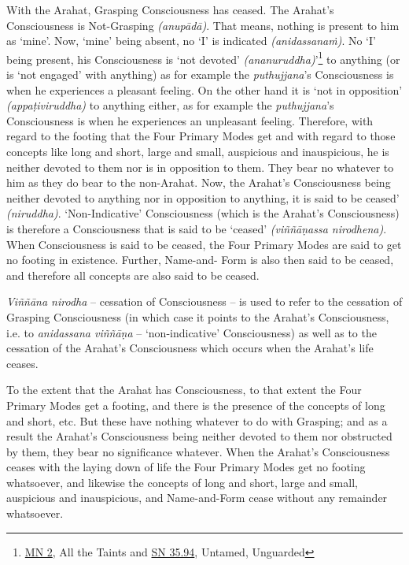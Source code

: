 With the Arahat, Grasping Consciousness has ceased. The Arahat's Consciousness is Not-Grasping \emph{(anupādā)}. That means, nothing is present to him as `mine'. Now, `mine' being absent, no `I' is indicated \emph{(anidassanaṁ)}. No `I' being present, his Consciousness is `not devoted' \emph{(ananuruddha)}'\footnote{\href{https://suttacentral.net/mn2/en/bodhi}{MN 2}, All the Taints and \href{https://suttacentral.net/sn35.94/en/bodhi}{SN 35.94}, Untamed, Unguarded} to anything (or is `not engaged' with anything) as for example the \emph{puthujjana}'s Consciousness is when he experiences a pleasant feeling. On the other hand it is `not in opposition' \emph{(appaṭiviruddha)} to anything either, as for example the \emph{puthujjana}'s Consciousness is when he experiences an unpleasant feeling. Therefore, with regard to the footing that the Four Primary Modes get and with regard to those concepts like long and short, large and small, auspicious and inauspicious, he is neither devoted to them nor is in opposition to them. They bear no  whatever to him as they do bear to the non-Arahat. Now, the Arahat's Consciousness being neither devoted to anything nor in opposition to anything, it is said to be ceased' \emph{(niruddha)}. `Non-Indicative' Consciousness (which is the Arahat's Consciousness) is therefore a Consciousness that is said to be `ceased' \emph{(viññāṇassa nirodhena)}. When Consciousness is said to be ceased, the Four Primary Modes are said to get no footing in existence. Further, Name-and- Form is also then said to be ceased, and therefore all concepts are also said to be ceased.

\emph{Viññāna nirodha} -- cessation of Consciousness -- is used to refer to the cessation of Grasping Consciousness (in which case it points to the Arahat's Consciousness, i.e. to \emph{anidassana viññāṇa} -- `non-indicative' Consciousness) as well as to the cessation of the Arahat's Consciousness which occurs when the Arahat's life ceases.

To the extent that the Arahat has Consciousness, to that extent the Four Primary Modes get a footing, and there is the presence of the concepts of long and short, etc. But these have nothing whatever to do with Grasping; and as a result the Arahat's Consciousness being neither devoted to them nor obstructed by them, they bear no significance whatever. When the Arahat's Consciousness ceases with the laying down of life the Four Primary Modes get no footing whatsoever, and likewise the concepts of long and short, large and small, auspicious and inauspicious, and Name-and-Form cease without any remainder whatsoever.

